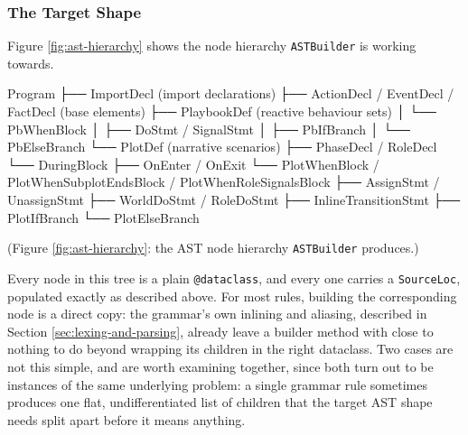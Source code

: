 \subsubsection{The Target Shape}
Figure \ref{fig:ast-hierarchy} shows the node hierarchy \lstinline|ASTBuilder| is working towards.
\begin{codeblock}[]{}
Program
├── ImportDecl                           (import declarations)
├── ActionDecl / EventDecl / FactDecl    (base elements)
├── PlaybookDef                          (reactive behaviour sets)
│   └── PbWhenBlock
│       ├── DoStmt / SignalStmt
│       ├── PbIfBranch
│       └── PbElseBranch
└── PlotDef                              (narrative scenarios)
    ├── PhaseDecl / RoleDecl
    └── DuringBlock
        ├── OnEnter / OnExit
        └── PlotWhenBlock / PlotWhenSubplotEndsBlock / PlotWhenRoleSignalsBlock
            ├── AssignStmt / UnassignStmt
            ├── WorldDoStmt / RoleDoStmt
            ├── InlineTransitionStmt
            ├── PlotIfBranch
            └── PlotElseBranch
\end{codeblock}
\label{fig:ast-hierarchy}
\begin{center}
(Figure \ref{fig:ast-hierarchy}: the AST node hierarchy \lstinline|ASTBuilder| produces.)
\end{center}
Every node in this tree is a plain \lstinline|@dataclass|, and every one carries a \lstinline|SourceLoc|, populated exactly as described above. For most rules, building the corresponding node is a direct copy: the grammar's own inlining and aliasing, described in Section \ref{sec:lexing-and-parsing}, already leave a builder method with close to nothing to do beyond wrapping its children in the right dataclass. Two cases are not this simple, and are worth examining together, since both turn out to be instances of the same underlying problem: a single grammar rule sometimes produces one flat, undifferentiated list of children that the target AST shape needs split apart before it means anything.


